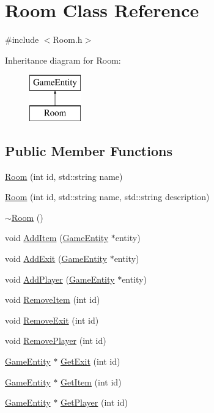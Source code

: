 \hypertarget{class_room}{}\section{Room Class Reference}
\label{class_room}


{\ttfamily \#include $<$Room.\+h$>$}

Inheritance diagram for Room\+:\begin{figure}[H]
\begin{center}
\leavevmode
\includegraphics[height=2.000000cm]{class_room}
\end{center}
\end{figure}
\subsection*{Public Member Functions}
\begin{DoxyCompactItemize}
\item 
\hyperlink{class_room_a18d9c7ed056c4bec868cf6939dc90aac}{Room} (int id, std\+::string name)
\item 
\hyperlink{class_room_a2286569deae9af3cafc5716ce72dcbf1}{Room} (int id, std\+::string name, std\+::string description)
\item 
\hyperlink{class_room_a67d5da09983cc53097807fd43ba5481a}{$\sim$\+Room} ()
\item 
void \hyperlink{class_room_a174291564fa1e50053230b844c9dc401}{Add\+Item} (\hyperlink{class_game_entity}{Game\+Entity} $\ast$entity)
\item 
void \hyperlink{class_room_a9d3ded2524dc65d34bcdac48ebfbca4f}{Add\+Exit} (\hyperlink{class_game_entity}{Game\+Entity} $\ast$entity)
\item 
void \hyperlink{class_room_acc80f8dea695a3eee94607fa83531c8c}{Add\+Player} (\hyperlink{class_game_entity}{Game\+Entity} $\ast$entity)
\item 
void \hyperlink{class_room_a2911ca54dcdcde1e2d483d039e01cc62}{Remove\+Item} (int id)
\item 
void \hyperlink{class_room_a18fe6c4958fe671bcb417bc8fa5b2f3a}{Remove\+Exit} (int id)
\item 
void \hyperlink{class_room_a218c9ab86637b3eadf36e51c71299765}{Remove\+Player} (int id)
\item 
\hyperlink{class_game_entity}{Game\+Entity} $\ast$ \hyperlink{class_room_af804da54d2d3649637bd0f9f7a3bf989}{Get\+Exit} (int id)
\item 
\hyperlink{class_game_entity}{Game\+Entity} $\ast$ \hyperlink{class_room_a71f95f978920afe3a2a991d8bcf394f3}{Get\+Item} (int id)
\item 
\hyperlink{class_game_entity}{Game\+Entity} $\ast$ \hyperlink{class_room_a2a3ab0dc562a3bd4ad61ebea0a8ced08}{Get\+Player} (int id)
\end{DoxyCompactItemize}


